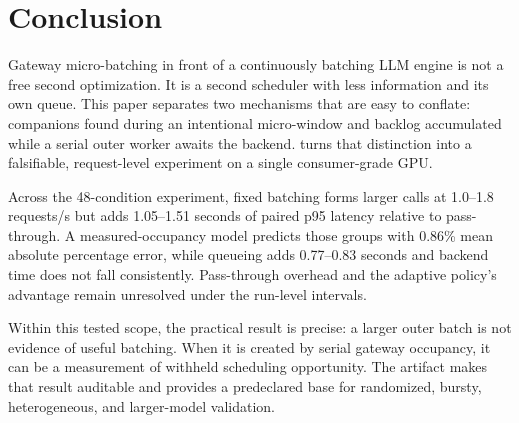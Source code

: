 \section{Conclusion}
\label{sec:conclusion}

Gateway micro-batching in front of a continuously batching LLM engine is not a
free second optimization. It is a second scheduler with less information and
its own queue. This paper separates two mechanisms that are easy to conflate:
companions found during an intentional micro-window and backlog accumulated
while a serial outer worker awaits the backend. \adip{} turns that distinction
into a falsifiable, request-level experiment on a single consumer-grade GPU.

Across the 48-condition experiment, fixed batching forms larger calls at
1.0--1.8 requests/s but adds 1.05--1.51 seconds of paired p95 latency relative
to pass-through. A measured-occupancy model predicts those groups with 0.86\%
mean absolute percentage error, while queueing adds 0.77--0.83 seconds and
backend time does not fall consistently. Pass-through overhead and the
adaptive policy's advantage remain unresolved under the run-level intervals.

Within this tested scope, the practical result is precise: a larger outer
batch is not evidence of useful batching. When it is created by serial gateway
occupancy, it can be a measurement of withheld scheduling opportunity. The
artifact makes that result auditable and provides a predeclared base for
randomized, bursty, heterogeneous, and larger-model validation.
